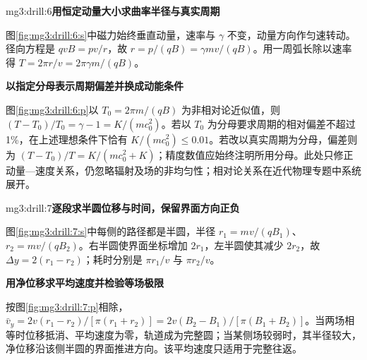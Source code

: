 \begin{drillsolution}{mg3:drill:6}\textbf{用恒定动量大小求曲率半径与真实周期}\par\nobreak
图\ref{fig:mg3:drill:6:s}中磁力始终垂直动量，速率与 $\gamma$ 不变，动量方向作匀速转动。径向方程是 $qvB=pv/r$，故 $r=p/(qB)=\gamma mv/(qB)$。用一周弧长除以速率得 $T=2\pi r/v=2\pi\gamma m/(qB)$。



\par\medskip{}\noindent\textbf{以指定分母表示周期偏差并换成动能条件}\par\nobreak
图\ref{fig:mg3:drill:6:p}以 $T_0=2\pi m/(qB)$ 为非相对论近似值，则 $(T-T_0)/T_0=\gamma-1=K/(mc_0^2)$。若以 $T_0$ 为分母要求周期的相对偏差不超过1\%，在上述理想条件下恰有 $K/(mc_0^2)\le0.01$。若改以真实周期为分母，偏差则为 $(T-T_0)/T=K/(mc_0^2+K)$；精度数值应始终注明所用分母。此处只修正动量—速度关系，仍忽略辐射及场的非均匀性；相对论关系在近代物理专题中系统展开。\end{drillsolution}
\begin{drillsolution}{mg3:drill:7}\textbf{逐段求半圆位移与时间，保留界面方向正负}\par\nobreak
图\ref{fig:mg3:drill:7:s}中每侧的路径都是半圆，半径 $r_1=mv/(qB_1)$、$r_2=mv/(qB_2)$。右半圆使界面坐标增加 $2r_1$，左半圆使其减少 $2r_2$，故 $\Delta y=2(r_1-r_2)$；耗时分别是 $\pi r_1/v$ 与 $\pi r_2/v$。



\par\medskip{}\noindent\textbf{用净位移求平均速度并检验等场极限}\par\nobreak
按图\ref{fig:mg3:drill:7:p}相除，$\bar v_y=2v(r_1-r_2)/[\pi(r_1+r_2)]=2v(B_2-B_1)/[\pi(B_1+B_2)]$。当两场相等时位移抵消、平均速度为零，轨道成为完整圆；当某侧场较弱时，其半径较大，净位移沿该侧半圆的界面推进方向。该平均速度只适用于完整往返。\end{drillsolution}
